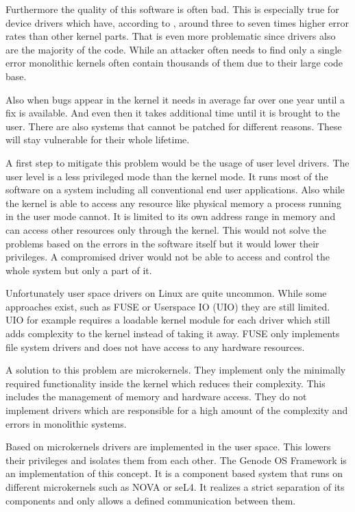 \documentclass[
a4paper,
11pt,
twoside
]{report}
\begin{document}
		Furthermore the quality of this software is often bad.
		This is especially true for device drivers which have, according to \citep{Chou:SOSP:01},  around three to seven times higher error rates than other kernel parts.
		That is even more problematic since drivers also are the majority of the code.
		While an attacker often needs to find only a single error monolithic kernels often contain thousands of them due to their large code base.
		
		Also when bugs appear in the kernel it needs in average far over one year until a fix is available.
		And even then it takes additional time until it is brought to the user.
		There are also systems that cannot be patched for different reasons.
		These will stay vulnerable for their whole lifetime. \citep{Chou:SOSP:01}
		
		A first step to mitigate this problem would be the usage of user level drivers.
		The user level is a less privileged mode than the kernel mode.
		It runs most of the software on a system including all conventional end user applications.
		Also while the kernel is able to access any resource like physical memory a process running in the user mode cannot.
		It is limited to its own address range in memory and can access other resources only through the kernel.
		This would not solve the problems based on the errors in the software itself but it would lower their privileges.
		A compromised driver would not be able to access and control the whole system but only a part of it.
		
		Unfortunately user space drivers on Linux are quite uncommon.
		While some approaches exist, such as FUSE \citep{fuse} or Userspace IO (UIO) \citep{uio} they are still limited.
		UIO for example requires a loadable kernel module for each driver which still adds complexity to the kernel instead of taking it away.
		FUSE only implements file system drivers and does not have access to any hardware resources.
		
		A solution to this problem are microkernels.
		They implement only the minimally required functionality inside the kernel which reduces their complexity.
		This includes the management of memory and hardware access.
		They do not implement drivers which are responsible for a high amount of the complexity and errors in monolithic systems. \citep{Chou:SOSP:01}
		
		Based on microkernels drivers are implemented in the user space.
		This lowers their privileges and isolates them from each other.
		The Genode OS Framework is an implementation of this concept. 
		It is a component based system that runs on different microkernels such as NOVA or seL4.
		It realizes a strict separation of its components and only allows a defined communication between them.
		
\end{document}
